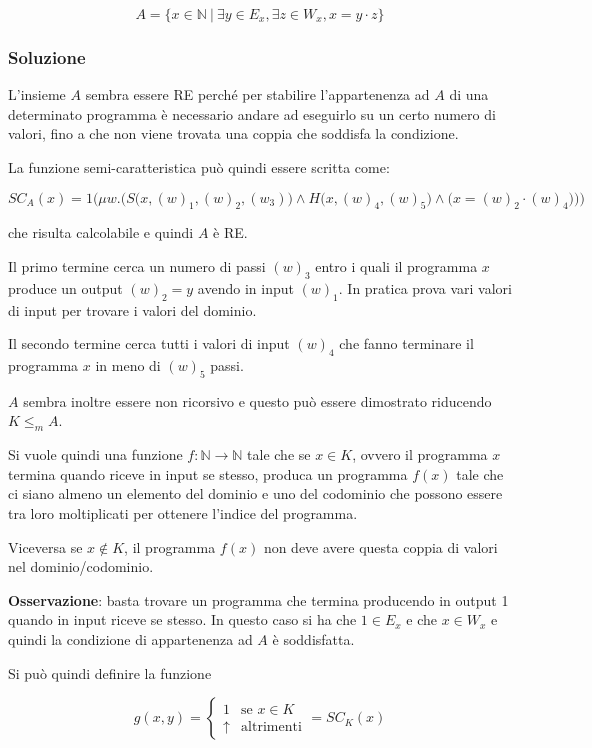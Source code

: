 $$
A = \{ x \in \mathbb{N} \:|\: \exists y \in E_x, \exists z \in W_x, x = y \cdot z  \}
$$

\subsubsection{Soluzione}

L'insieme $A$ sembra essere RE perché per stabilire l'appartenenza ad $A$ di una determinato programma è necessario andare ad eseguirlo su un certo numero di valori, fino a che non viene trovata una coppia che soddisfa la condizione.

La funzione semi-caratteristica può quindi essere scritta come:

$$
SC_A(x) = 1 \bigg( \mu w . \Big( S\big(x, (w)_1, (w)_2, (w_3)\big) \wedge H\big(x, (w)_4, (w)_5\big) \wedge \big( x = (w)_2 \cdot (w)_4 \big)  \Big) \bigg)
$$

che risulta calcolabile e quindi $A$ è RE.

Il primo termine cerca un numero di passi $(w)_3$ entro i quali il programma $x$ produce un output $(w)_2 = y$ avendo in input $(w)_1$. In pratica prova vari valori di input per trovare i valori del dominio.

Il secondo termine cerca tutti i valori di input $(w)_4$ che fanno terminare il programma $x$ in meno di $(w)_5$ passi.

$A$ sembra inoltre essere non ricorsivo e questo può essere dimostrato riducendo $K \leq_m A$.

Si vuole quindi una funzione $f : \mathbb{N} \rightarrow \mathbb{N}$ tale che se $x \in K$, ovvero il programma $x$ termina quando riceve in input se stesso, produca un programma $f(x)$ tale che ci siano almeno un elemento del dominio e uno del codominio che possono essere tra loro moltiplicati per ottenere l'indice del programma. 

Viceversa se $x \notin K$, il programma $f(x)$ non deve avere questa coppia di valori nel dominio/codominio.

\textbf{Osservazione}: basta trovare un programma che termina producendo in output 1 quando in input riceve se stesso. In questo caso si ha che $1 \in E_x$ e che $x \in W_x$ e quindi la condizione di appartenenza ad $A$ è soddisfatta.

Si può quindi definire la funzione

$$
g(x,y) = \begin{cases}
1 &\text{se } x \in K\\
\uparrow &\text{altrimenti}
\end{cases} = SC_K(x)
$$

